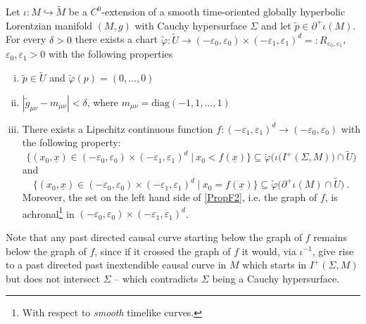 \documentclass[reqno]{article}
\begin{document}
\begin{proposition}\label{PropBoundaryChart}
Let $\iota : M \hookrightarrow \tilde{M}$ be a $C^0$-extension of a smooth time-oriented globally hyperbolic Lorentzian manifold $(M,g)$ with Cauchy hypersurface $\Sigma$  and let $\tilde{p} \in \partial^+ \iota(M)$. For every $\delta >0$ there exists a chart $\tilde{\varphi} : \tilde{U} \to(-\varepsilon_0, \varepsilon_0) \times  (-\varepsilon_1, \varepsilon_1)^{d} =: R_{\varepsilon_0, \varepsilon_1}$, $\varepsilon_0, \varepsilon_1 >0$ with the following properties
\begin{enumerate}[i)]
\item $\tilde{p} \in \tilde{U}$ and $\tilde{\varphi}(p) = (0, \ldots, 0)$
\item $|\tilde{g}_{\mu \nu} - m_{\mu \nu}| < \delta$, where $m_{\mu \nu} = \mathrm{diag}(-1, 1, \ldots , 1)$
\item There exists a Lipschitz continuous function $f : (-\varepsilon_1, \varepsilon_1)^d \to (-\varepsilon_0, \varepsilon_0)$ with the following property: 
\begin{equation}\label{PropF1}
\{(x_0,\underline{x}) \in (-\varepsilon_0, \varepsilon_0) \times (-\varepsilon_1, \varepsilon_1)^{d} \; | \: x_0 < f(\underline{x})\} \subseteq \tilde{\varphi} \big( \iota\big(I^+(\Sigma,M)\big)\cap \tilde{U}\big)
\end{equation} and 
\begin{equation}\label{PropF2}
\{(x_0,\underline{x}) \in (-\varepsilon_0, \varepsilon_0) \times (-\varepsilon_1, \varepsilon_1)^{d}  \; | \: x_0 = f(\underline{x})\} \subseteq \tilde{\varphi}\big(\partial^+\iota(M)\cap \tilde{U}\big) \;.
\end{equation}
Moreover, the set on the left hand side of \eqref{PropF2}, i.e. the graph of $f$, is achronal\footnote{With respect to \emph{smooth} timelike curves.} in $(-\varepsilon_0, \varepsilon_0) \times  (-\varepsilon_1, \varepsilon_1)^{d}$.
\end{enumerate}
\end{proposition}

Note that any past directed causal curve starting below the graph of $f$ remains below the graph of $f$, since if it crossed the graph of $f$ it would, via $\iota^{-1}$, give rise to a past directed past inextendible causal curve in $M$ which starts in $I^+(\Sigma,M)$ but does not intersect $\Sigma$ -- which contradicts $\Sigma$ being a Cauchy hypersurface.
\end{document}
